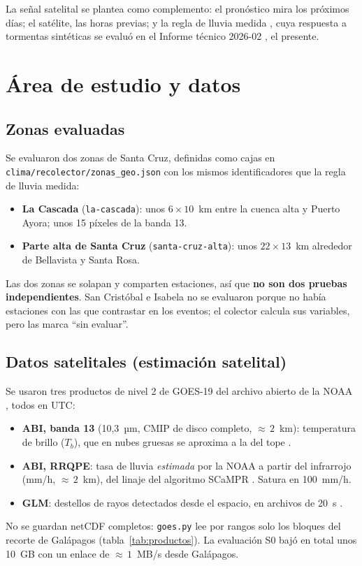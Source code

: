 \documentclass{sosg-informe}
\begin{document}
La señal satelital se plantea como complemento: el pronóstico \citep{sosg202608} mira los próximos días; el satélite, las horas previas; y la regla de lluvia medida \citep{sosg202607}, cuya respuesta a tormentas sintéticas se evaluó en el Informe técnico 2026-02 \citep{sosg202602}, el presente.

\section{Área de estudio y datos}

\subsection{Zonas evaluadas}
Se evaluaron dos zonas de Santa Cruz, definidas como cajas en \texttt{clima/recolector/zonas\_geo.json} con los mismos identificadores que la regla de lluvia medida:
\begin{itemize}
  \item \textbf{La Cascada} (\texttt{la-cascada}): unos $6 \times 10$~km entre la cuenca alta y Puerto Ayora; unos 15 píxeles de la banda 13.
  \item \textbf{Parte alta de Santa Cruz} (\texttt{santa-cruz-alta}): unos $22 \times 13$~km alrededor de Bellavista y Santa Rosa.
\end{itemize}
Las dos zonas se solapan y comparten estaciones, así que \textbf{no son dos pruebas independientes}. San Cristóbal e Isabela no se evaluaron porque no había estaciones con las que contrastar en los eventos; el colector calcula sus variables, pero las marca \enquote{sin evaluar}.

\subsection{Datos satelitales (estimación satelital)}
Se usaron tres productos de nivel 2 de GOES-19 del archivo abierto de la NOAA \citep{noaa_goes19}, todos en UTC:
\begin{itemize}
  \item \textbf{ABI, banda 13} (10,3~µm, CMIP de disco completo, ${\approx}\,2$~km): temperatura de brillo ($T_b$), que en nubes gruesas se aproxima a la del tope \citep{schmit2017}.
  \item \textbf{ABI, RRQPE}: tasa de lluvia \emph{estimada} por la NOAA a partir del infrarrojo (mm/h, ${\approx}\,2$~km), del linaje del algoritmo SCaMPR \citep{kuligowski2002}. Satura en 100~mm/h.
  \item \textbf{GLM}: destellos de rayos detectados desde el espacio, en archivos de 20~s \citep{goodman2013}.
\end{itemize}
No se guardan netCDF completos: \texttt{goes.py} lee por rangos solo los bloques del recorte de Galápagos (tabla~\ref{tab:productos}). La evaluación S0 bajó en total unos 10~GB con un enlace de ${\approx}\,1$~MB/s desde Galápagos.
\end{document}

